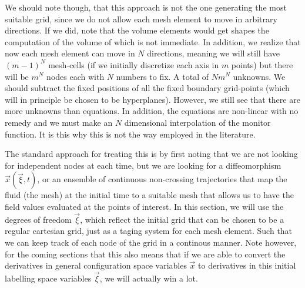 \documentclass[11pt, a4paper]{article} %
\begin{document}
We should note though, that this approach is not the one generating the most suitable grid, since we do not allow each mesh element to move in arbitrary directions. If we did, note that the volume elements would get shapes the computation of the volume of which is not immediate. In addition, we realize that now each mesh element can move in $N$ directions, meaning we will still have $(m-1)^N$ mesh-cells (if we initially discretize each axis in $m$ points) but there will be $m^N$ nodes each with $N$ numbers to fix. A total of $Nm^N$ unknowns. We should subtract the fixed positions of all the fixed boundary grid-points (which will in principle be chosen to be hyperplanes). However, we still see that there are more unknowns than equations. In addition, the equations are non-linear with no remedy and we must make an $N$ dimensional interpolation of the monitor function. It is this why this is not the way employed in the literature.

The standard approach for treating this is by first noting that we are not looking for independent nodes at each time, but we are looking for a diffeomorphism $\vec{x}(\vec{\xi},t)$, or an ensemble of continuous non-crossing trajectories that map the fluid (the mesh) at the initial time to a suitable mesh that allows us to have the field values evaluated at the points of interest. In this section, we will use the degrees of freedom $\vec{\xi}$, which reflect the initial grid that can be chosen to be a regular cartesian grid, just as a taging system for each mesh element. Such that we can keep track of each node of the grid in a continous manner. Note however, for the coming sections that this also means that if we are able to convert the derivatives in general configuration space variables $\vec{x}$ to derivatives in this initial labelling space variables $\vec{\xi}$, we will actually win a lot.
\end{document}
